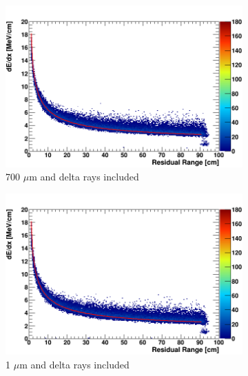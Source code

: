 \begin{figure}[ht!]
        \begin{subfigure}[b]{0.495\textwidth}   
            \centering 
            \includegraphics[width=\textwidth]{derr_proton_delta_700um}
            \caption{700 $\mu$m and delta rays included}%
            \label{fig:derr_proton_delta_700}
        \end{subfigure}
        \hfill
        \begin{subfigure}[b]{0.495\textwidth}   
            \centering 
            \includegraphics[width=\textwidth]{derr_proton_delta_1um}
            \caption{1 $\mu$m and delta rays included}%
            \label{fig:derr_proton_delta_1}
        \end{subfigure}
        \begin{subfigure}[b]{0.495\textwidth}   
            \centering 

\end{subfigure}
\end{figure}

